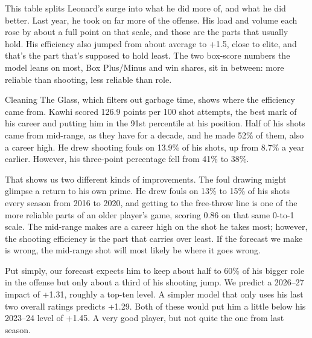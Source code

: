 \documentclass[11pt]{article}
\begin{document}
This table splits Leonard's surge into what he did more of, and what he did better. Last year, he
took on far more of the offense. His load and volume each rose by about a full point on that
scale, and those are the parts that usually hold. His efficiency also jumped from about average
to +1.5, close to elite, and that's the part that's supposed to hold least. The two box-score
numbers the model leans on most, Box Plus/Minus and win shares, sit in between: more reliable than
shooting, less reliable than role.

Cleaning The Glass, which filters out garbage time, shows where the efficiency came from. Kawhi
scored 126.9 points per 100 shot attempts, the best mark of his career and putting him in the 91st
percentile at his position. Half of his shots came from mid-range, as they have for a decade, and
he made 52\% of them, also a career high. He drew shooting fouls on 13.9\% of his shots, up from
8.7\% a year earlier. However, his three-point percentage fell from 41\% to
38\%.

That shows us two different kinds of improvements. The foul drawing might glimpse a return to his
own prime. He drew fouls on 13\% to 15\% of his shots every season from 2016 to 2020, and getting
to the free-throw line is one of the more reliable parts of an older player's game, scoring 0.86
on that same 0-to-1 scale. The mid-range makes are a career high on the shot he takes most;
however, the shooting efficiency is the part that carries over least. If the forecast we make is
wrong, the mid-range shot will most likely be where it goes wrong.

Put simply, our forecast expects him to keep about half to 60\% of his bigger role in the offense but
only about a third of his shooting jump. We predict a 2026--27 impact of +1.31, roughly a top-ten level.
A simpler model that only uses his last two overall ratings predicts +1.29. Both of these would put
him a little below his 2023--24 level of +1.45. A very good player, but not quite the one from last
season.
\end{document}
